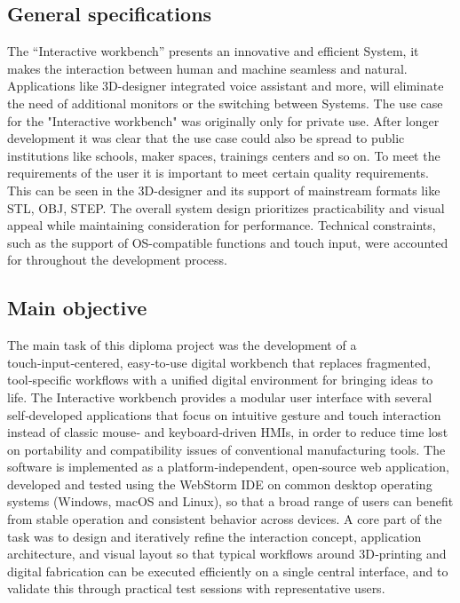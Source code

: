 \documentclass[a4paper,12pt]{article}
\begin{document}
\subsection{General specifications}
The “Interactive workbench” presents an innovative and efficient System, it makes the interaction between human and machine seamless and natural. Applications like 3D-designer integrated voice assistant and more, will eliminate the need of additional monitors or the switching between Systems.
The use case for the "Interactive workbench" was originally only for private use. After longer development it was clear that the use case could also be spread to public institutions like schools, maker spaces, trainings centers and so on. To meet the requirements of the user it is important to meet certain quality requirements. This can be seen in the 3D-designer and its support of mainstream formats like STL, OBJ, STEP.
The overall system design prioritizes practicability and visual appeal while maintaining consideration for performance. 
Technical constraints, such as the support of OS-compatible functions and touch input, were accounted for throughout the development process.
 
\subsection{Main objective}
The main task of this diploma project was the development of a touch‑input‑centered, easy‑to‑use digital workbench that replaces fragmented, tool‑specific workflows with a unified digital environment for bringing ideas to life. The Interactive workbench provides a modular user interface with several self‑developed applications that focus on intuitive gesture and touch interaction instead of classic mouse‑ and keyboard‑driven HMIs, in order to reduce time lost on portability and compatibility issues of conventional manufacturing tools. The software is implemented as a platform‑independent, open‑source web application, developed and tested using the WebStorm IDE on common desktop operating systems (Windows, macOS and Linux), so that a broad range of users can benefit from stable operation and consistent behavior across devices. A core part of the task was to design and iteratively refine the interaction concept, application architecture, and visual layout so that typical workflows around 3D‑printing and digital fabrication can be executed efficiently on a single central interface, and to validate this through practical test sessions with representative users.  
\end{document}
